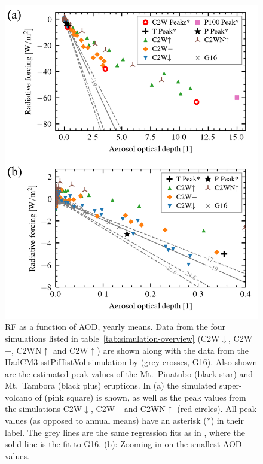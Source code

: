 \documentclass[draft]{agujournal2019}
\newcommand{\cwmp}{C2W\(-\)}
\newcommand{\cwm}{C2W\(\downarrow\)}
\newcommand{\cws}{C2WN\(\uparrow\)}
\newcommand{\cwsn}{C2W\(\uparrow\)}
\begin{document}
\begin{figure}
  \centering
  \includegraphics{figures/figure2.png}

  \caption{RF as a function of AOD, yearly means. Data from the four simulations listed in
    table~\ref{tab:simulation-overview} (\cwm{}, \cwmp{}, \cws{} and \cwsn{}) are shown
    along with the data from the HadCM3 sstPiHistVol simulation by  (grey
    crosses, G16). Also shown are the estimated peak values of the Mt.\ Pinatubo (black
    star) and Mt.\ Tambora (black plus) eruptions. In (a) the simulated super-volcano of
     (pink square) is shown, as well as the peak values from the
    simulations \cwm{}, \cwmp{} and \cws{} (red circles). All peak values (as opposed to
    annual means) have an asterisk (\(\ast{}\)) in their label. The grey lines are the same
    regression fits as in , where the solid line is the fit to
    G16. (b): Zooming in on the smallest AOD values.}\label{fig:aod_vs_toa_ses_avg}%
\end{figure}
\end{document}
